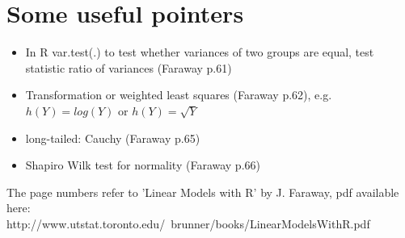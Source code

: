 \documentclass{article}
\begin{document}
\section{Some useful pointers}
\begin{itemize}
    \item In R var.test(.) to test whether variances of two groups are equal, test statistic ratio of variances (Faraway p.61)
    \item Transformation or weighted least squares (Faraway p.62), e.g. $h(Y) = log(Y)$ or $h(Y) = \sqrt{Y}$
    \item long-tailed: Cauchy (Faraway p.65)
    \item Shapiro Wilk test for normality (Faraway p.66)
\end{itemize}

The page numbers refer to 'Linear Models with R' by J. Faraway, pdf available here: \\http://www.utstat.toronto.edu/~brunner/books/LinearModelsWithR.pdf
\end{document}
